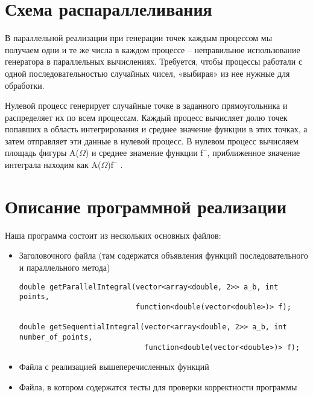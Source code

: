 \documentclass{report}
\begin{document}
\section*{Схема распараллеливания}
В параллельной реализации при генерации точек каждым процессом мы получаем
одни и те же числа в каждом процессе – неправильное использование генератора в
параллельных вычислениях. Требуется, чтобы процессы работали с одной
последовательностью случайных чисел, «выбирая» из нее нужные для обработки. 
\par Нулевой процесс генерирует случайные точке в заданного прямоугольника и
распределяет их по всем процессам. Каждый процесс вычисляет долю точек попавших в
область интегрирования и среднее значение функции в этих точках, а затем отправляет эти
данные в нулевой процесс. В нулевом процесс вычисляем площадь фигуры A($\Omega$) и среднее
знамение функции f¯, приближенное значение интеграла находим как A($\Omega$)f¯ .
\newpage

\section*{Описание программной реализации}
Наша программа состоит из нескольких основных файлов:

\begin{itemize}
\item Заголовочного файла (там содержатся объявления функций последовательного и параллельного метода)
\begin{lstlisting}
double getParallelIntegral(vector<array<double, 2>> a_b, int points,
                           function<double(vector<double>)> f);
                           
double getSequentialIntegral(vector<array<double, 2>> a_b, int number_of_points,
                             function<double(vector<double>)> f);
\end{lstlisting}
\item Файла с реализацией вышеперечисленных функций
\item Файла, в котором содержатся тесты для проверки корректности программы
\end{itemize}


\newpage

\end{document}
